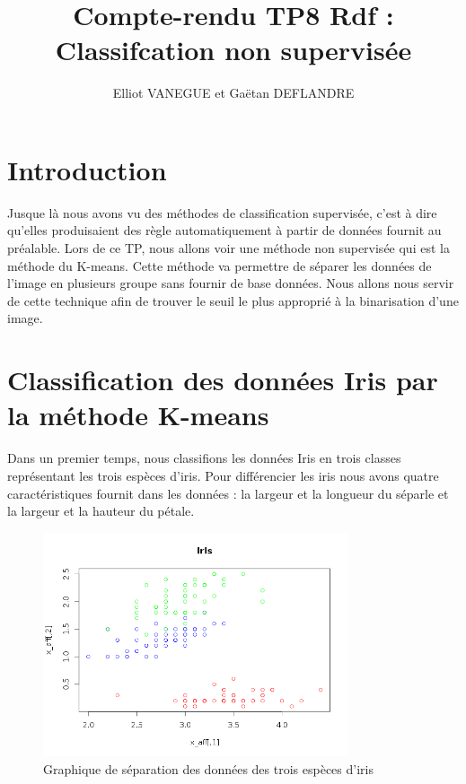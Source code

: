 \documentclass[a4paper,11pt]{article}
\title{Compte-rendu TP8 Rdf : Classifcation non supervisée}
\author{Elliot VANEGUE et Gaëtan DEFLANDRE}
\begin{document}
  
  
  
  \maketitle
  
  \mbox{}
  \newpage
  \clearpage
  
  \section*{Introduction}
  Jusque là nous avons vu des méthodes de classification supervisée, c'est à dire qu'elles produisaient
  des règle automatiquement à partir de données fournit au préalable. 
  Lors de ce TP, nous allons voir une méthode non supervisée qui est la méthode du K-means. Cette méthode
  va permettre de séparer les données de l'image en plusieurs groupe sans fournir de base données. Nous allons
  nous servir de cette technique afin de trouver le seuil le plus approprié à la binarisation d'une image.
  
  \section{Classification des données Iris par la méthode K-means}
  Dans un premier temps, nous classifions les données Iris en trois classes représentant les trois espèces
  d'iris. Pour différencier les iris nous avons quatre caractéristiques fournit dans les données : la largeur et
  la longueur du séparle et la largeur et la hauteur du pétale.\\
  
  \begin{figure}[H]
    \center
    \includegraphics[width=9cm]{resultat/separation_espece.png}
    \caption{Graphique de séparation des données des trois espèces d'iris}
  \end{figure}
  
\end{document}
